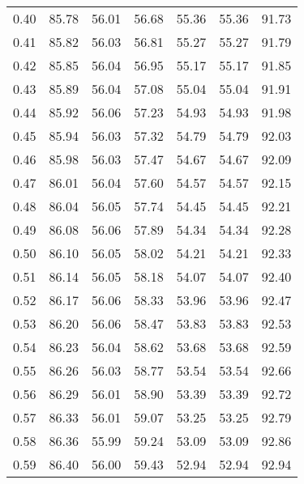 \begin{tabular}{|c|c|c|c|c|c|c|}
      0.40 &     85.78 &     56.01 &      56.68 &   55.36 &      55.36 &         91.73 \\
      0.41 &     85.82 &     56.03 &      56.81 &   55.27 &      55.27 &         91.79 \\
      0.42 &     85.85 &     56.04 &      56.95 &   55.17 &      55.17 &         91.85 \\
      0.43 &     85.89 &     56.04 &      57.08 &   55.04 &      55.04 &         91.91 \\
      0.44 &     85.92 &     56.06 &      57.23 &   54.93 &      54.93 &         91.98 \\
      0.45 &     85.94 &     56.03 &      57.32 &   54.79 &      54.79 &         92.03 \\
      0.46 &     85.98 &     56.03 &      57.47 &   54.67 &      54.67 &         92.09 \\
      0.47 &     86.01 &     56.04 &      57.60 &   54.57 &      54.57 &         92.15 \\
      0.48 &     86.04 &     56.05 &      57.74 &   54.45 &      54.45 &         92.21 \\
      0.49 &     86.08 &     56.06 &      57.89 &   54.34 &      54.34 &         92.28 \\
      0.50 &     86.10 &     56.05 &      58.02 &   54.21 &      54.21 &         92.33 \\
      0.51 &     86.14 &     56.05 &      58.18 &   54.07 &      54.07 &         92.40 \\
      0.52 &     86.17 &     56.06 &      58.33 &   53.96 &      53.96 &         92.47 \\
      0.53 &     86.20 &     56.06 &      58.47 &   53.83 &      53.83 &         92.53 \\
      0.54 &     86.23 &     56.04 &      58.62 &   53.68 &      53.68 &         92.59 \\
      0.55 &     86.26 &     56.03 &      58.77 &   53.54 &      53.54 &         92.66 \\
      0.56 &     86.29 &     56.01 &      58.90 &   53.39 &      53.39 &         92.72 \\
      0.57 &     86.33 &     56.01 &      59.07 &   53.25 &      53.25 &         92.79 \\
      0.58 &     86.36 &     55.99 &      59.24 &   53.09 &      53.09 &         92.86 \\
      0.59 &     86.40 &     56.00 &      59.43 &   52.94 &      52.94 &         92.94 \\

\end{tabular}

